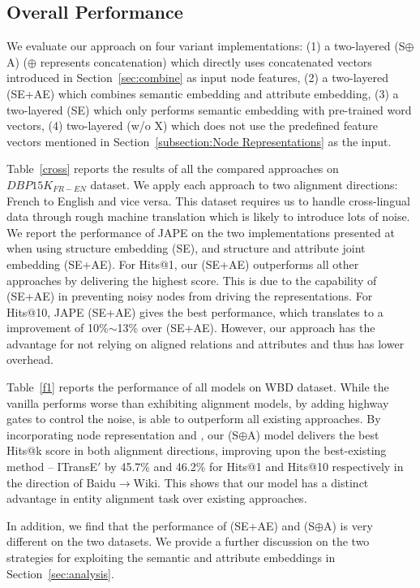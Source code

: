 \subsection{Overall Performance\label{overall}}
We evaluate our approach on four variant implementations: (1) a two-layered \HRGCN (S$\oplus$A) ($\oplus$ represents concatenation) which directly uses concatenated vectors
introduced in Section~\ref{sec:combine} as input node features, (2) a two-layered \HRGCN (SE+AE) which combines semantic embedding and
attribute embedding, (3) a two-layered \HRGCN (SE) which only performs semantic embedding with pre-trained word vectors, (4) two-layered
\HRGCN (w/o X) which does not use the predefined feature vectors mentioned in Section~\ref{subsection:Node
		Representations} as the input.

 Table~\ref{cross} reports the results of all the compared approaches on $DBP15K_{FR-EN}$
dataset. We apply each approach
 to two alignment directions: French to English and vice versa. This dataset requires us to handle
cross-lingual data through rough machine translation which is likely to introduce lots of noise. We report the performance of JAPE on the
two implementations presented at
 ~\cite{sun2017cross} when using structure embedding (SE), and structure and attribute joint embedding (SE+AE).
For Hits@1, our \HRGCN (SE+AE) outperforms all other approaches by delivering the highest score. This is due to the capability of \HRGCN
(SE+AE) in preventing noisy nodes from driving the \KG representations. For Hits@10, JAPE (SE+AE) gives the best performance, which
translates to a improvement of 10\%$\sim$13\% over \HRGCN (SE+AE). However, our approach has the advantage for not relying on aligned
relations and attributes and thus has lower overhead.


 Table~\ref{f1} reports the performance of all models on WBD dataset. While the vanilla \GCN performs worse than
exhibiting alignment models, by adding highway gates to control the noise, \HGCN is able to outperform all existing approaches. By
incorporating node representation and \RGCN, our \HRGCN (S$\oplus$A) model delivers the best Hits@k score in both alignment directions,
improving upon the best-existing method -- ITransE$'$ by 45.7\% and 46.2\% for Hits@1 and Hits@10 respectively in the direction of
Baidu$\rightarrow$Wiki. This shows that our model has a distinct advantage in entity alignment task over existing approaches.

In addition, we find that the performance of \HRGCN (SE+AE) and \HRGCN (S$\oplus$A) is very different on the two datasets. We provide a further discussion on the two strategies for exploiting the semantic and attribute embeddings in Section~\ref{sec:analysis}.


